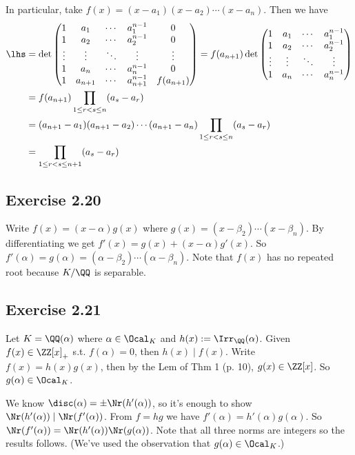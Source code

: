 \documentclass[../Chapter.tex]{subfiles}
\begin{document}
In particular, take $f(x)=(x-a_1)(x-a_2)\cdots(x-a_n)$. Then we have
$$
\begin{aligned}
\lhs &= \det\begin{pmatrix}
1           & a_1        & \cdots & a_1^{n-1}        & 0 \\
1           & a_2        & \cdots & a_2^{n-1}       & 0 \\
\vdots & \vdots    & \ddots & \vdots              & \vdots \\
1           & a_n        & \cdots & a_n^{n-1}        & 0 \\
1           & a_{n+1} & \cdots & a_{n+1}^{n-1} & f(a_{n+1})
\end{pmatrix}
=
f(a_{n+1})
\det\begin{pmatrix}
1           & a_1      & \cdots & a_1^{n-1} \\
1           & a_2     & \cdots & a_2^{n-1} \\
\vdots & \vdots & \ddots & \vdots \\
1          & a_n      & \cdots & a_n^{n-1}
\end{pmatrix} \\
&= f(a_{n+1})\prod_{1\leq r<s\leq n}(a_s-a_r) \\
&= (a_{n+1}-a_1)(a_{n+1}-a_2)\cdots(a_{n+1}-a_n)\prod_{1\leq r<s\leq n}(a_s-a_r)  \\
&= \prod_{1\leq r<s\leq n+1}(a_s-a_r)
\end{aligned}
$$

\subsection*{Exercise 2.20}

Write $f(x)=(x-\alpha)g(x)$ where $g(x)=(x-\beta_2)\cdots(x-\beta_n)$. By differentiating we get $f'(x)=g(x)+(x-\alpha)g'(x)$. So $f'(\alpha)=g(\alpha)=(\alpha-\beta_2)\cdots(\alpha-\beta_n)$. Note that $f(x)$ has no repeated root because $K/\QQ$ is separable.

\subsection*{Exercise 2.21}

Let $K=\QQ(\alpha)$ where $\alpha\in\Ocal_K$ and $h(x):=\Irr_\QQ(\alpha)$. Given $f(x)\in\ZZ[x]_+$ s.t. $f(\alpha)=0$, then $h(x)\mid f(x)$. Write $f(x)=h(x)g(x)$, then by the Lem of Thm 1 (p. 10), $g(x)\in\ZZ[x]$. So $g(\alpha)\in\Ocal_K$.

We know $\disc(\alpha)=\pm \Nr(h'(\alpha))$, so it's enough to show $\Nr(h'(\alpha))\mid\Nr(f'(\alpha))$. From $f=hg$ we have $f'(\alpha)=h'(\alpha)g(\alpha)$. So $\Nr(f'(\alpha))=\Nr(h'(\alpha))\Nr(g(\alpha))$. Note that all three norms are integers so the results follows. (We've used the observation that $g(\alpha)\in\Ocal_K$.)
\end{document}
